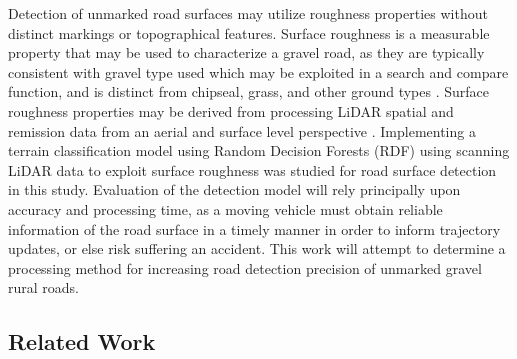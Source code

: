 \documentclass[journal,onecolumn]{IEEEtran}
\begin{document}
	

	
	{Detection of unmarked road surfaces may utilize roughness properties without distinct markings or topographical features. Surface roughness is a measurable property that may be used to characterize a gravel road, as they are typically consistent with gravel type used \cite{skorseth_gravel_nodate} which may be exploited in a search and compare function, and is distinct from chipseal, grass, and other ground types \cite{wan_road_2007, levi_3d_2012_light, levi_3d_2012_terrain}. Surface roughness properties may be derived from processing LiDAR spatial and remission data from an aerial and surface level perspective \cite{wan_road_2007, levi_3d_2012_light, levi_3d_2012_terrain, pollyea_experimental_2012,rychkov_computational_2012,lague_accurate_2013,brubaker_use_2013,turner_estimation_2014,campbell_lidar-based_2017,shepard_roughness_2001,tegowski_statistical_2016,sock_probabilistic_2016,milenkovic_roughness_2018,yadav_extraction_2017, yadav_rural_2018}. Implementing a terrain classification model using Random Decision Forests (RDF) using scanning LiDAR data to exploit surface roughness was studied for road surface detection in this study. Evaluation of the detection model will rely principally upon accuracy and processing time, as a moving vehicle must obtain reliable information of the road surface in a timely manner in order to inform trajectory updates, or else risk suffering an accident. This work will attempt to determine a processing method for increasing road detection precision of unmarked gravel rural roads.}
		
\subsection{Related Work}
	
\end{document}
